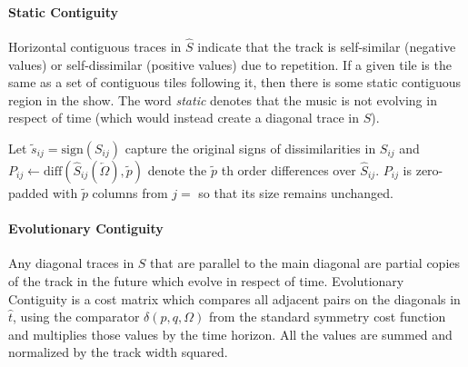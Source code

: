 \documentclass[twocolumn]{article}
\begin{document}
	
	
	
\paragraph{Static Contiguity}

Horizontal contiguous traces in $\hat S$ indicate that the track is
self-similar (negative values) or self-dissimilar (positive values)
due to repetition. If a given tile is the same as a set of contiguous
tiles following it, then there is some static contiguous region in the
show. The word \textit{static} denotes that the music is not evolving in
respect of time (which would instead create a diagonal trace in $S$).

Let $\tilde s_{ij} = \mathrm{sign}(S_{ij} )$ capture the original signs of dissimilarities in $S_{ij}$ and  $P_{ij} \leftarrow \mathrm{diff}( \hat S_{ij}( \overleftarrow{\Omega} ), \tilde p)$ denote the $\tilde p$ th order differences over $\hat S_{ij}$. $P_{ij}$ is zero-padded with $\tilde p$ columns from $j=$ so that its size remains unchanged. 









	
	\paragraph{Evolutionary Contiguity}

	
	Any diagonal traces in $S$ that are parallel to the main diagonal are partial copies of the track in the future which evolve in respect of time. Evolutionary Contiguity is a cost matrix which compares all adjacent pairs on the diagonals in $\hat t$, using the comparator $\delta( p,q, \Omega )$ from the standard symmetry cost function and multiplies those values by the time horizon. All the values are summed and normalized by the track width squared. 
	
\end{document}

